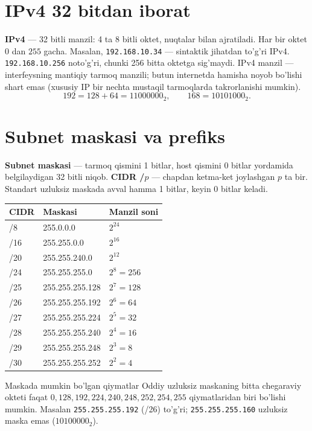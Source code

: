 \documentclass[11pt,a4paper,oneside]{book}
\newcommand{\kw}[1]{\textbf{\color{Deep}#1}}
\newcommand{\ip}[1]{\texttt{#1}}
\begin{document}
\section{IPv4 32 bitdan iborat}
\kw{IPv4} — 32 bitli manzil: 4 ta 8 bitli oktet, nuqtalar bilan ajratiladi. Har bir oktet $0$ dan $255$ gacha. Masalan, \ip{192.168.10.34} — sintaktik jihatdan to'g'ri IPv4. \ip{192.168.10.256} noto'g'ri, chunki 256 bitta oktetga sig'maydi. IPv4 manzil — interfeysning mantiqiy tarmoq manzili; butun internetda hamisha noyob bo'lishi shart emas (xususiy IP bir nechta mustaqil tarmoqlarda takrorlanishi mumkin).
\[192=128+64=11000000_2,\qquad 168=10101000_2.\]
\section{Subnet maskasi va prefiks}
\kw{Subnet maskasi} — tarmoq qismini 1 bitlar, host qismini 0 bitlar yordamida belgilaydigan 32 bitli niqob. \kw{CIDR /$p$} — chapdan ketma-ket joylashgan $p$ ta bir. Standart uzluksiz maskada avval hamma 1 bitlar, keyin 0 bitlar keladi.
\par\medskip
\par\medskip
\begin{tabularx}{\textwidth}{p{}p{}Y}\toprule
CIDR & Maskasi & Manzil soni\\\midrule
/8 & 255.0.0.0 & $2^{24}$\\
/16 & 255.255.0.0 & $2^{16}$\\
/20 & 255.255.240.0 & $2^{12}$\\
/24 & 255.255.255.0 & $2^8=256$\\
/25 & 255.255.255.128 & $2^7=128$\\
/26 & 255.255.255.192 & $2^6=64$\\
/27 & 255.255.255.224 & $2^5=32$\\
/28 & 255.255.255.240 & $2^4=16$\\
/29 & 255.255.255.248 & $2^3=8$\\
/30 & 255.255.255.252 & $2^2=4$\\\bottomrule\end{tabularx}
\begin{caution}{Maskada mumkin bo'lgan qiymatlar}
Oddiy uzluksiz maskaning bitta chegaraviy okteti faqat $0,128,192,224,240,248,252,254,255$ qiymatlaridan biri bo'lishi mumkin. Masalan \ip{255.255.255.192} (/26) to'g'ri; \ip{255.255.255.160} uzluksiz maska emas ($10100000_2$).
\end{caution}
\end{document}
